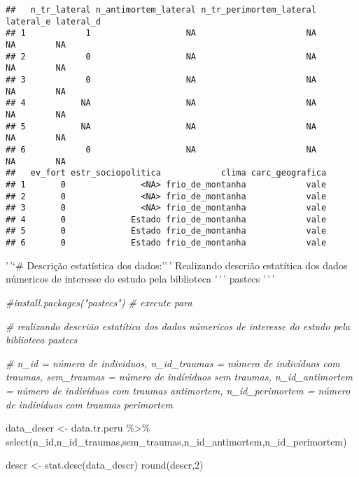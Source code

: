 \documentclass[
]{article}
\newenvironment{Shaded}{\begin{snugshade}}{\end{snugshade}}
\newcommand{\CommentTok}[1]{\textcolor[rgb]{0.56,0.35,0.01}{\textit{#1}}}
\newcommand{\DecValTok}[1]{\textcolor[rgb]{0.00,0.00,0.81}{#1}}
\newcommand{\FunctionTok}[1]{\textcolor[rgb]{0.00,0.00,0.00}{#1}}
\newcommand{\NormalTok}[1]{#1}
\newcommand{\OtherTok}[1]{\textcolor[rgb]{0.56,0.35,0.01}{#1}}
\newcommand{\SpecialCharTok}[1]{\textcolor[rgb]{0.00,0.00,0.00}{#1}}
\begin{document}
\begin{verbatim}
##   n_tr_lateral n_antimortem_lateral n_tr_perimortem_lateral lateral_e lateral_d
## 1            1                   NA                      NA        NA        NA
## 2            0                   NA                      NA        NA        NA
## 3            0                   NA                      NA        NA        NA
## 4           NA                   NA                      NA        NA        NA
## 5           NA                   NA                      NA        NA        NA
## 6            0                   NA                      NA        NA        NA
##   ev_fort estr_sociopolitica            clima carc_geografica
## 1       0               <NA> frio_de_montanha            vale
## 2       0               <NA> frio_de_montanha            vale
## 3       0               <NA> frio_de_montanha            vale
## 4       0             Estado frio_de_montanha            vale
## 5       0             Estado frio_de_montanha            vale
## 6       0             Estado frio_de_montanha            vale
\end{verbatim}

'\,'`\# Descrição estatística dos dados:''\,' Realizando descrião
estatítica dos dados númericos de interesse do estudo pela biblioteca
'\,'\,' pastecs '\,'\,'

\begin{Shaded}
\begin{Highlighting}[]
\CommentTok{\#install.packages("pastecs") \# execute para }

\CommentTok{\# realizando descrião estatítica dos dados númericos de interesse do estudo pela biblioteca \textquotesingle{}\textquotesingle{}\textquotesingle{} pastecs \textquotesingle{}\textquotesingle{}\textquotesingle{}}

\CommentTok{\# n\_id = número de individuos, n\_id\_traumas = número de indivíduos com traumas, sem\_traumas = número de indíviduos sem traumas, n\_id\_antimortem = número de indivíduos com traumas antimortem, n\_id\_perimortem = número de indivíduos com traumas perimortem}

\NormalTok{data\_descr }\OtherTok{\textless{}{-}}\NormalTok{ data.tr.peru }\SpecialCharTok{\%\textgreater{}\%} \FunctionTok{select}\NormalTok{(n\_id,n\_id\_traumas,sem\_traumas,n\_id\_antimortem,n\_id\_perimortem)}

\NormalTok{descr }\OtherTok{\textless{}{-}} \FunctionTok{stat.desc}\NormalTok{(data\_descr)}
\FunctionTok{round}\NormalTok{(descr,}\DecValTok{2}\NormalTok{)}
\end{Highlighting}
\end{Shaded}
\end{document}
